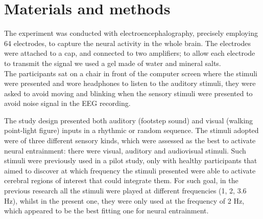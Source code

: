 \section{Materials and methods}
The experiment was conducted with electroencephalography, precisely employing 64 electrodes, to capture the neural activity in the whole brain. The electrodes were attached to a cap, and connected to two amplifiers; to allow each electrode to transmit the signal we used a gel made of water and mineral salts. \\
The participants sat on a chair in front of the computer screen where the stimuli were presented and wore headphones to listen to the auditory stimuli, they were asked to avoid moving and blinking when the sensory stimuli were presented to avoid noise signal in the EEG recording. 

The study design presented both auditory (footstep sound) and visual (walking point-light figure) inputs in a rhythmic or random sequence.
The stimuli adopted were of three different sensory kinds, which were assessed as the best to activate neural entrainment: there were visual, auditory and audiovisual stimuli. Such stimuli were previously used in a pilot study, only with healthy participants that aimed to discover at which frequency the stimuli presented were able to activate cerebral regions of interest that could integrate them. For such goal, in the previous research all the stimuli were played at different frequencies (1, 2, 3.6 Hz), whilst in the present one, they were only used at the frequency of 2 Hz, which appeared to be the best fitting one for neural entrainment. 

